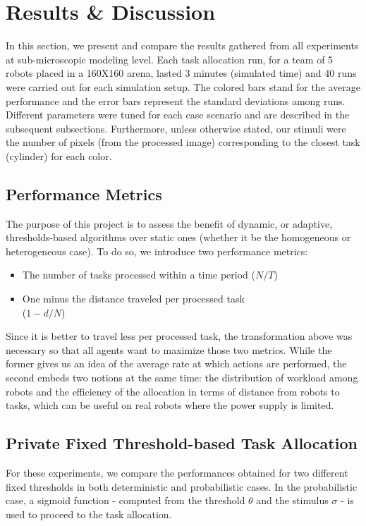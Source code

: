 \section{Results \& Discussion}
In this section, we present and compare the results gathered from all experiments at sub-microscopic modeling level. Each task allocation run, for a team of 5 robots placed in a 160X160 arena, lasted 3 minutes (simulated time) and 40 runs were carried out for each simulation setup. The colored bars stand for the average performance and the error bars represent the standard deviations among runs. Different parameters were tuned for each case scenario and are described in the subsequent subsections. Furthermore, unless otherwise stated, our stimuli were the number of pixels (from the processed image) corresponding to the closest task (cylinder) for each color.

\subsection{Performance Metrics}
The purpose of this project is to assess the benefit of dynamic, or adaptive, thresholds-based algorithms over static ones (whether it be the homogeneous or heterogeneous case). To do so, we introduce two performance metrics:
\begin{itemize}
	\item The number of tasks processed within a time period ($N/T$)
	\item One minus the distance traveled per processed task \\ ($1-d/N$)
\end{itemize}
Since it is better to travel less per processed task, the transformation above was necessary so that all agents want to maximize those two metrics.
While the former gives us an idea of the average rate at which actions are performed, the second embeds two notions at the same time: the distribution of workload among robots and the efficiency of the allocation in terms of distance from robots to tasks, which can be useful on real robots where the power supply is limited.

\subsection{Private Fixed Threshold-based Task Allocation}
For these experiments, we compare the performances obtained for two different fixed thresholds in both deterministic and probabilistic cases. In the probabilistic case, a sigmoid function - computed from the threshold $\theta$ and the stimulus $\sigma$ - is used to proceed to the task allocation.

